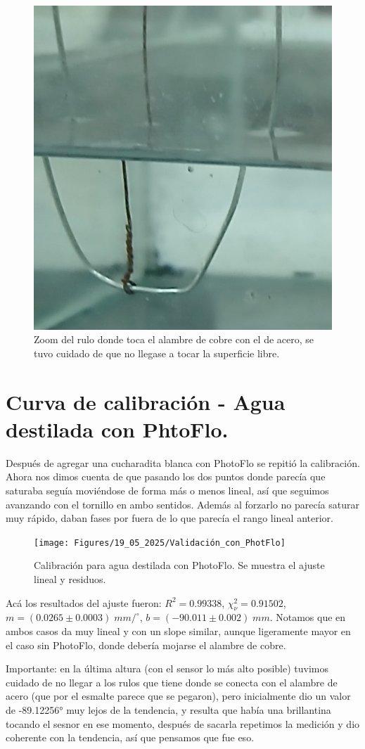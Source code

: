 \begin{figure}[th!]
	\centering
	\includegraphics[width=0.2357\linewidth]{Figures/19_05_2025/Rulos}
	\caption{Zoom del rulo donde toca el alambre de cobre con el de acero, se tuvo cuidado de que no llegase a tocar la superficie libre.}
	\label{fig:rulos}
\end{figure}


\section{Curva de calibración - Agua destilada con PhtoFlo.}
Después de agregar una cucharadita blanca con PhotoFlo se repitió la calibración. Ahora nos dimos cuenta de que pasando los dos puntos donde parecía que saturaba seguía moviéndose de forma más o menos lineal, así que seguimos avanzando con el tornillo en ambo sentidos. Además al forzarlo no parecía saturar muy rápido, daban fases por fuera de lo que parecía el rango lineal anterior.

\begin{figure}[th!]
	\centering
	\texttt{[image: Figures/19\_05\_2025/Validación\_con\_PhotFlo]}
	\caption{Calibración para agua destilada con PhotoFlo. Se muestra el ajuste lineal y residuos.} %
	\label{fig:validacionconphotflo}
\end{figure}


Acá los resultados del ajuste fueron: $R^2=0.99338$,	$\chi_\nu^2=0.91502$,	$m = (0.0265 \pm 0.0003)\; mm/^\circ$,	$b = (-90.011 \pm 0.002)\; mm$. Notamos que en ambos casos da muy lineal y con un slope similar, aunque ligeramente mayor en el caso sin PhotoFlo, donde debería mojarse el alambre de cobre. %



Importante: en la última altura (con el sensor lo más alto posible) tuvimos cuidado de no llegar a los rulos que tiene donde se conecta con el alambre de acero (que por el esmalte parece que se pegaron), pero inicialmente dio un valor de -89.12256° muy lejos de la tendencia, y resulta que había una brillantina tocando el sesnor en ese momento, después de sacarla repetimos la medición y dio coherente con la tendencia, así que pensamos que fue eso.


